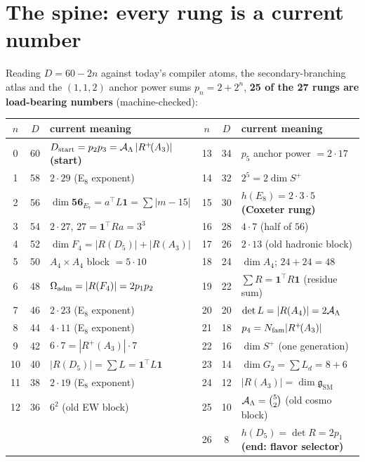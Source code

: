 \section{The spine: every rung is a current number}
Reading $D=60-2n$ against today's compiler atoms, the secondary-branching atlas and the $(1,1,2)$ anchor
power sums $p_n=2+2^n$, \textbf{25 of the 27 rungs are load-bearing numbers} (machine-checked):

\begin{center}\scriptsize
\renewcommand{\arraystretch}{1.04}
\begin{tabularx}{\linewidth}{@{}cc>{\raggedright\arraybackslash}p{4.9cm}cc>{\raggedright\arraybackslash}p{4.9cm}@{}}
\toprule
$n$ & $D$ & \textbf{current meaning} & $n$ & $D$ & \textbf{current meaning} \\
\midrule
0 & 60 & $D_{\mathrm{start}}=p_2p_3=\mathcal A_\Lambda\,|R^+\!(A_3)|$ \textbf{(start)} & 13 & 34 & $p_5$ anchor power $=2\cdot17$ \\
1 & 58 & $2\cdot29$ (E$_8$ exponent) & 14 & 32 & $2^5=2\dim S^+$ \\
2 & 56 & $\dim\mathbf{56}_{E_7}=a^\top L\mathbf 1=\sum|m{-}15|$ & 15 & 30 & $h(E_8)=2{\cdot}3{\cdot}5$ \textbf{(Coxeter rung)} \\
3 & 54 & $2\cdot27$, $27=\mathbf 1^\top Ra=3^3$ & 16 & 28 & $4\cdot7$ (half of $56$) \\
4 & 52 & $\dim F_4=|R(D_5)|{+}|R(A_3)|$ & 17 & 26 & $2\cdot13$ (old hadronic block) \\
5 & 50 & $A_4{\times}A_4$ block $=5{\cdot}10$ & 18 & 24 & $\dim A_4$; $24{+}24{=}48$ \\
6 & 48 & $\Omega_{\mathrm{adm}}=|R(F_4)|=2p_1p_2$ & 19 & 22 & $\sum R=\mathbf 1^\top R\mathbf 1$ (residue sum) \\
7 & 46 & $2\cdot23$ (E$_8$ exponent) & 20 & 20 & $\det L=|R(A_4)|=2\mathcal A_\Lambda$ \\
8 & 44 & $4\cdot11$ (E$_8$ exponent) & 21 & 18 & $p_4=N_{\mathrm{fam}}|R^+\!(A_3)|$ \\
9 & 42 & $6\cdot7=|R^+\!(A_3)|\cdot7$ & 22 & 16 & $\dim S^+$ (one generation) \\
10 & 40 & $|R(D_5)|=\sum L=\mathbf 1^\top L\mathbf 1$ & 23 & 14 & $\dim G_2=\sum L_d=8{+}6$ \\
11 & 38 & $2\cdot19$ (E$_8$ exponent) & 24 & 12 & $|R(A_3)|=\dim\mathfrak g_{\mathrm{SM}}$ \\
12 & 36 & $6^2$ (old EW block) & 25 & 10 & $\mathcal A_\Lambda=\binom52$ (old cosmo block) \\
   &    &                                & 26 & \phantom{0}8 & $h(D_5)=\det R=2p_1$ \textbf{(end: flavor selector)} \\
\bottomrule
\end{tabularx}
\end{center}

